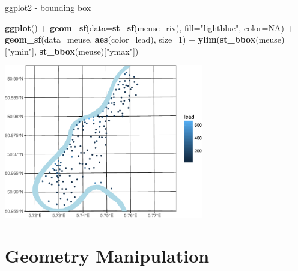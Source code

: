\documentclass[11pt,ignorenonframetext,]{beamer}
\newenvironment{Shaded}{}{}
\newcommand{\DataTypeTok}[1]{\textcolor[rgb]{0.56,0.13,0.00}{#1}}
\newcommand{\DecValTok}[1]{\textcolor[rgb]{0.25,0.63,0.44}{#1}}
\newcommand{\KeywordTok}[1]{\textcolor[rgb]{0.00,0.44,0.13}{\textbf{#1}}}
\newcommand{\NormalTok}[1]{#1}
\newcommand{\OperatorTok}[1]{\textcolor[rgb]{0.40,0.40,0.40}{#1}}
\newcommand{\OtherTok}[1]{\textcolor[rgb]{0.00,0.44,0.13}{#1}}
\newcommand{\StringTok}[1]{\textcolor[rgb]{0.25,0.44,0.63}{#1}}
\let\oldShaded\Shaded
\let\endoldShaded\endShaded
\renewenvironment{Shaded}{\footnotesize\begin{spacing}{0.9}\oldShaded}{\endoldShaded\end{spacing}}
\let\oldverbatim\verbatim
\let\endoldverbatim\endverbatim
\newcommand{\scriptoutput}{
  \renewenvironment{Shaded}{\scriptsize\begin{spacing}{0.9}\oldShaded}{\endoldShaded\end{spacing}}
  \renewenvironment{verbatim}{\scriptsize\begin{spacing}{0.9}\oldverbatim}{\endoldverbatim\end{spacing}}
}
\begin{document}
\begin{frame}[fragile,t]{ggplot2 - bounding box}
\protect\hypertarget{ggplot2---bounding-box}{}

\scriptoutput

\begin{Shaded}
\begin{Highlighting}[]
\KeywordTok{ggplot}\NormalTok{() }\OperatorTok{+}
\StringTok{  }\KeywordTok{geom_sf}\NormalTok{(}\DataTypeTok{data=}\KeywordTok{st_sf}\NormalTok{(meuse_riv), }\DataTypeTok{fill=}\StringTok{"lightblue"}\NormalTok{, }\DataTypeTok{color=}\OtherTok{NA}\NormalTok{) }\OperatorTok{+}
\StringTok{  }\KeywordTok{geom_sf}\NormalTok{(}\DataTypeTok{data=}\NormalTok{meuse, }\KeywordTok{aes}\NormalTok{(}\DataTypeTok{color=}\NormalTok{lead), }\DataTypeTok{size=}\DecValTok{1}\NormalTok{) }\OperatorTok{+}
\StringTok{  }\KeywordTok{ylim}\NormalTok{(}\KeywordTok{st_bbox}\NormalTok{(meuse)[}\StringTok{"ymin"}\NormalTok{], }\KeywordTok{st_bbox}\NormalTok{(meuse)[}\StringTok{"ymax"}\NormalTok{])}
\end{Highlighting}
\end{Shaded}

\begin{center}\includegraphics[width=0.65\textwidth]{Lec16_files/figure-beamer/unnamed-chunk-16-1} \end{center}

\end{frame}

\hypertarget{geometry-manipulation}{%
\section{Geometry Manipulation}\label{geometry-manipulation}}
\end{document}
